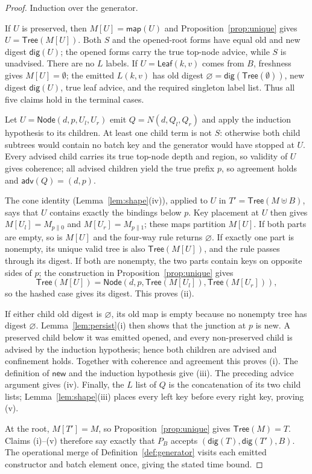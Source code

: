 \documentclass[11pt]{article}
\begin{document}
\begin{proof}
Induction over the generator.

If $U$ is preserved, then $M[U]=\mathsf{map}(U)$ and Proposition~\ref{prop:unique} gives $U=\mathsf{Tree}(M[U])$. Both $S$ and the opened-root forms have equal old and new digest $\mathsf{dig}(U)$; the opened forms carry the true top-node advice, while $S$ is unadvised. There are no $L$ labels. If $U=\mathsf{Leaf}(k,v)$ comes from $B$, freshness gives $M[U]=\emptyset$; the emitted $L(k,v)$ has old digest $\varnothing=\mathsf{dig}(\mathsf{Tree}(\emptyset))$, new digest $\mathsf{dig}(U)$, true leaf advice, and the required singleton label list. Thus all five claims hold in the terminal cases.

Let $U=\mathsf{Node}(d,p,U_l,U_r)$ emit $Q=N(d,Q_l,Q_r)$ and apply the induction hypothesis to its children. At least one child term is not $S$: otherwise both child subtrees would contain no batch key and the generator would have stopped at $U$. Every advised child carries its true top-node depth and region, so validity of $U$ gives coherence; all advised children yield the true prefix $p$, so agreement holds and $\mathsf{adv}(Q)=(d,p)$.

The cone identity (Lemma~\ref{lem:shape}(iv)), applied to $U$ in $T'=\mathsf{Tree}(M\uplus B)$, says that $U$ contains exactly the bindings below $p$. Key placement at $U$ then gives $M[U_l]=M_{p\|0}$ and $M[U_r]=M_{p\|1}$; these maps partition $M[U]$. If both parts are empty, so is $M[U]$ and the four-way rule returns $\varnothing$. If exactly one part is nonempty, its unique valid tree is also $\mathsf{Tree}(M[U])$, and the rule passes through its digest. If both are nonempty, the two parts contain keys on opposite sides of $p$; the construction in Proposition~\ref{prop:unique} gives
\[
  \mathsf{Tree}(M[U])
  = \mathsf{Node}(d,p,\mathsf{Tree}(M[U_l]),\mathsf{Tree}(M[U_r])),
\]
so the hashed case gives its digest. This proves (ii).

If either child old digest is $\varnothing$, its old map is empty because no nonempty tree has digest $\varnothing$. Lemma~\ref{lem:persist}(i) then shows that the junction at $p$ is new. A preserved child below it was emitted opened, and every non-preserved child is advised by the induction hypothesis; hence both children are advised and confinement holds. Together with coherence and agreement this proves (i). The definition of $\mathsf{new}$ and the induction hypothesis give (iii). The preceding advice argument gives (iv). Finally, the $L$ list of $Q$ is the concatenation of its two child lists; Lemma~\ref{lem:shape}(iii) places every left key before every right key, proving (v).

At the root, $M[T']=M$, so Proposition~\ref{prop:unique} gives $\mathsf{Tree}(M)=T$. Claims (i)--(v) therefore say exactly that $P_B$ accepts $(\mathsf{dig}(T),\mathsf{dig}(T'),B)$. The operational merge of Definition~\ref{def:generator} visits each emitted constructor and batch element once, giving the stated time bound.
\end{proof}
\end{document}
